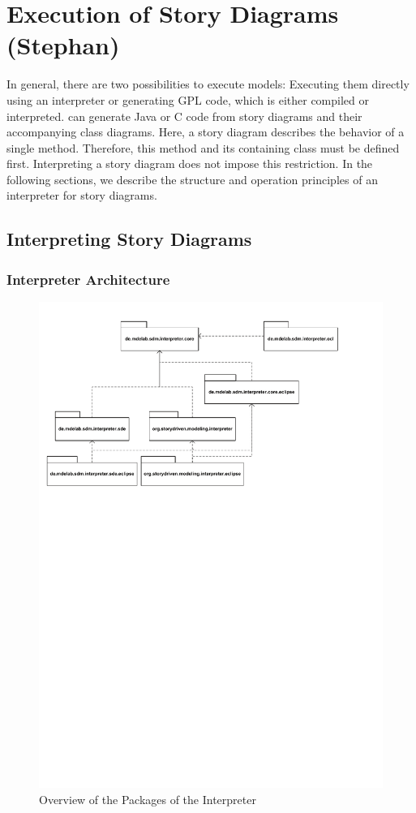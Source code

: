 \chapter{Execution of Story Diagrams (Stephan)}

In general, there are two possibilities to execute models: Executing them directly using an interpreter \cite{GHS09} or generating GPL code, which is either compiled or interpreted. 
\fuj can generate Java or C code from story diagrams and their accompanying class diagrams. 
Here, a story diagram describes the behavior of a single method. 
Therefore, this method and its containing class must be defined first. 
Interpreting a story diagram does not impose this restriction.
In the following sections, we describe the structure and operation principles of an interpreter for story diagrams.


\section{Interpreting Story Diagrams}

\subsection{Interpreter Architecture}

\begin{figure}[htb]
  \centering
  \includegraphics[width=1.0\columnwidth]{./figures/interpreter_packages.pdf}
  \caption{Overview of the Packages of the Interpreter}
  \label{fig:interpreter_packages}
\end{figure}

